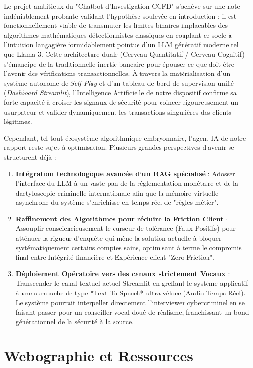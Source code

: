 \documentclass[12pt, a4paper, twoside]{report}
\begin{document}
Le projet ambitieux du "Chatbot d'Investigation CCFD" s'achève sur une note indéniablement probante validant l'hypothèse soulevée en introduction : il est fonctionnellement viable de transmuter les limites binaires implacables des algorithmes mathématiques détectionnistes classiques en couplant ce socle à l'intuition langagière formidablement pointue d'un LLM génératif moderne tel que Llama-3. Cette architecture duale (Cerveau Quantitatif / Cerveau Cognitif) s'émancipe de la traditionnelle inertie bancaire pour épouser ce que doit être l'avenir des vérifications transactionnelles. À travers la matérialisation d'un système autonome de \textit{Self-Play} et d'un tableau de bord de supervision unifié (\textit{Dashboard Streamlit}), l'Intelligence Artificielle de notre dispositif confirme sa forte capacité à croiser les signaux de sécurité pour coincer rigoureusement un usurpateur et valider dynamiquement les transactions singulières des clients légitimes.

Cependant, tel tout écosystème algorithmique embryonnaire, l'agent IA de notre rapport reste sujet à optimisation. Plusieurs grandes perspectives d'avenir se structurent déjà :
\begin{enumerate}\setlength\itemsep{0em}
    \item \textbf{Intégration technologique avancée d'un RAG spécialisé} : Adosser l'interface du LLM à un vaste pan de la réglementation monétaire et de la dactyloscopie criminelle internationale afin que la mémoire virtuelle asynchrone du système s'enrichisse en temps réel de "règles métier".
    \item \textbf{Raffinement des Algorithmes pour réduire la Friction Client} : Assouplir consciencieusement le curseur de tolérance (Faux Positifs) pour atténuer la rigueur d'enquête qui mène la solution actuelle à bloquer systématiquement certains comptes sains, optimisant à terme le compromis final entre Intégrité financière et Expérience client "Zero Friction".
    \item \textbf{Déploiement Opératoire vers des canaux strictement Vocaux} : Transcender le canal textuel actuel Streamlit en greffant le système applicatif à une surcouche de type *Text-To-Speech* ultra-véloce (Audio Temps Réel). Le système pourrait interpeller directement l'interviewer cybercriminel en se faisant passer pour un conseiller vocal doué de réalisme, franchissant un bond générationnel de la sécurité à la source.
\end{enumerate}

\chapter*{Webographie et Ressources}
\end{document}
